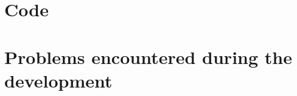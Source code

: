 \documentclass[11pt]{report}
\begin{document}
\chapter{Code}
\label{chap:code}

\chapter{Problems encountered during the development}
\end{document}
